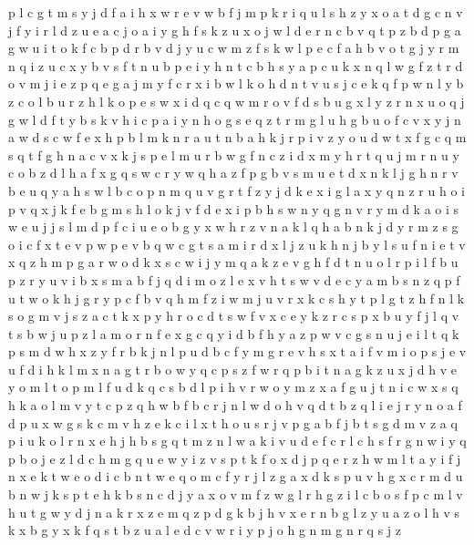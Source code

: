 \documentclass{article}
\begin{document}
p l c g t m s y j d f a i h x w r e v
w b f j m p k r i q u l s h z y x o a t d g c n v
j f
y i r l d z u e a c j o
a i y g h f s k z u x o j w l d e r n c b v q t p
z b d p g
a g w u i t o k f c b p d
r b v d j y u c w m z f
s k w l p e c f a h b v o t g j y r m n q i z
u c x y b v s f
t n
u b p e i y h n t c
b h s y a p c u k x n q l w g f z t r d o v m j i e
z p q e g a j m y f c r x i b w l k o h d n t v u s
j c e k q f p w n l
y b z c o
l b u r
z h l
k o p e s w x i d q
c q w m r o v f d s b u g x l y z
r n x u o q j g w l d f t y b s k v h i c p a
i y n h o g s e q z t r
m g l u
h g b u o f c v x y j n a w d s
c w f e x h p b l m k n r a u t
n b a h k j r p i v z y o u d w t x f g c q m s
q t f g h n a c v x k j s p e l m u r b w
g f n c z i d x m y h r t q u
j m r n u y c o b z d l h a f x g q s w
c r y w q h a z f p g b v s m u e t d x n k l
j g h n r v b e u q y
a h s w l b c o p n m q u v g r t f z y j d k e x i
g l a x y q n z r u h o i p
v q x j k f e b g m s h l o
k j v f d e x i p b h s w n y
q g n v r y m d k a o i s w e u j
j s l m d p f c i u e o b g y x w h r z v n a k
l q h a b n k j d y r m z s g o i c f x t e v p w
p e v b q w c g t s a m i r d x l j z u k h n
j b y l s u f n i e t v x q z h m p g a r w o d k
x s c w i j y m q a k z e v g h f d t n u o l r
p i l f b u
p z r y u v i b x s m
a b f j q d i m o z l e x v h t s w
v d e c y a m b s n z q p f u t w o k h j g r
y p c f b
v q h m
f z i w m j u v r x k c s h y t p l
g t z h f n l k s o
g m v j s z a c t k x p y h r o
c
d t s w f v x c e y
k z r c s p x b u y f j l q v
t s b w j u p z l a m o r n f e x g c q y i
d b f h y a z p w v c g s n u j e i l t q k
p s m d w h x z y f r b k j n l
p u d b c f y m g r e v h s x t a i
f v m i o
p s
j e v u f d i h k l m x n a g t r b o w y q c p s z
f w r q p b i t n a g k z u x j d h v e y o m l
t o p m l f u d k q
c s b d l p i h v r w o y m z x a f g u j t
n i c w x s q h
k a o l m v y t c p z q h w b
f b c r j n l w d o h v q
d
t b z q l i e j r y n o a f d p u x w g s k c m v h
z e k c i l x t h o u s r j v p g a b f
j b t s g d m v z a q p i u k o l r n x e h
j h b s g q t m z n l w a k i v u d e f c r
l c h s f r g n w i y q p b o j e z
l d c h m g q u e w y i z v s p t k f
o x d j p q e r z
h w m l
t a y i f j n x e
k t w e o d i c
b n t w e q o m c f y r j l z g a x d k s p u v
h g x c r m d u b n w j k s
p t e h k b s n c d j y a x o v m f z w g l r
h g z i l c b
o s f p c m l v h u t g w y d j n a k r x z e
m q z p d g k b j h v x e r
n b g l z y
u a z
o l h v s k x b g y
x k f q s t b z u a l e d c v w r i y p j o h g n m
g n r q s j z
\end{document}
